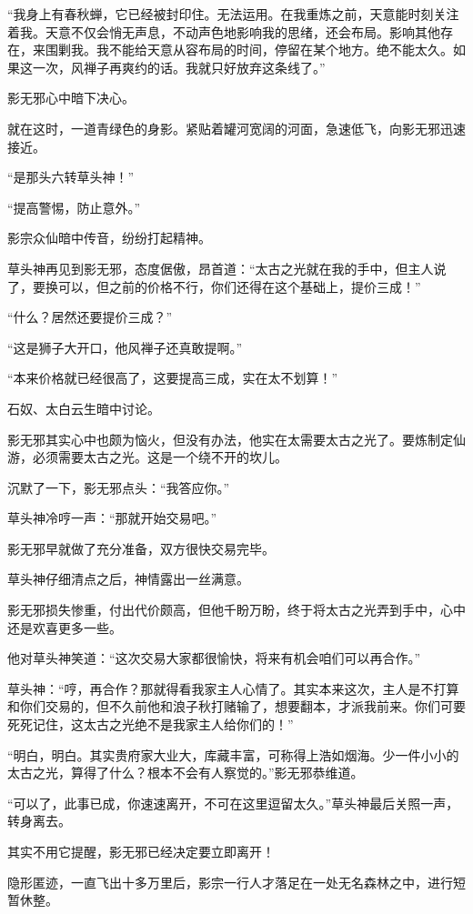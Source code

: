 \begin{this_body}
“我身上有春秋蝉，它已经被封印住。无法运用。在我重炼之前，天意能时刻关注着我。天意不仅会悄无声息，不动声色地影响我的思绪，还会布局。影响其他存在，来围剿我。我不能给天意从容布局的时间，停留在某个地方。绝不能太久。如果这一次，风禅子再爽约的话。我就只好放弃这条线了。”

影无邪心中暗下决心。

就在这时，一道青绿色的身影。紧贴着罐河宽阔的河面，急速低飞，向影无邪迅速接近。

“是那头六转草头神！”

“提高警惕，防止意外。”

影宗众仙暗中传音，纷纷打起精神。

草头神再见到影无邪，态度倨傲，昂首道：“太古之光就在我的手中，但主人说了，要换可以，但之前的价格不行，你们还得在这个基础上，提价三成！”

“什么？居然还要提价三成？”

“这是狮子大开口，他风禅子还真敢提啊。”

“本来价格就已经很高了，这要提高三成，实在太不划算！”

石奴、太白云生暗中讨论。

影无邪其实心中也颇为恼火，但没有办法，他实在太需要太古之光了。要炼制定仙游，必须需要太古之光。这是一个绕不开的坎儿。

沉默了一下，影无邪点头：“我答应你。”

草头神冷哼一声：“那就开始交易吧。”

影无邪早就做了充分准备，双方很快交易完毕。

草头神仔细清点之后，神情露出一丝满意。

影无邪损失惨重，付出代价颇高，但他千盼万盼，终于将太古之光弄到手中，心中还是欢喜更多一些。

他对草头神笑道：“这次交易大家都很愉快，将来有机会咱们可以再合作。”

草头神：“哼，再合作？那就得看我家主人心情了。其实本来这次，主人是不打算和你们交易的，但不久前他和浪子秋打赌输了，想要翻本，才派我前来。你们可要死死记住，这太古之光绝不是我家主人给你们的！”

“明白，明白。其实贵府家大业大，库藏丰富，可称得上浩如烟海。少一件小小的太古之光，算得了什么？根本不会有人察觉的。”影无邪恭维道。

“可以了，此事已成，你速速离开，不可在这里逗留太久。”草头神最后关照一声，转身离去。

其实不用它提醒，影无邪已经决定要立即离开！

隐形匿迹，一直飞出十多万里后，影宗一行人才落足在一处无名森林之中，进行短暂休整。


\end{this_body}
